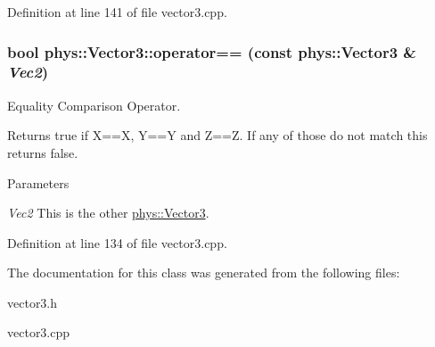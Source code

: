 Definition at line 141 of file vector3.cpp.

\hypertarget{classphys_1_1Vector3_a90dadb1a5cd2c5814e54c11c33f286c1}{
\subsubsection[{operator==}]{\setlength{\rightskip}{0pt plus 5cm}bool phys::Vector3::operator== (const {\bf phys::Vector3} \& {\em Vec2})}}
\label{d5/d6a/classphys_1_1Vector3_a90dadb1a5cd2c5814e54c11c33f286c1}


Equality Comparison Operator. 

Returns true if X==X, Y==Y and Z==Z. If any of those do not match this returns false. 
\begin{DoxyParams}{Parameters}
\item[{\em Vec2}]This is the other \hyperlink{classphys_1_1Vector3}{phys::Vector3}. \end{DoxyParams}


Definition at line 134 of file vector3.cpp.



The documentation for this class was generated from the following files:\begin{DoxyCompactItemize}
\item 
vector3.h\item 
vector3.cpp\end{DoxyCompactItemize}
